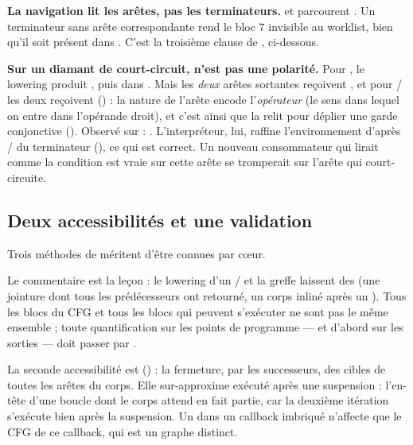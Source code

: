 \begin{piege}
\textbf{La navigation lit les arêtes, pas les terminateurs.}  et  parcourent . Un terminateur  sans arête  correspondante rend le bloc 7 invisible au worklist, bien qu'il soit présent dans . C'est la troisième clause de , ci-dessous.
\end{piege}

\begin{piege}
\textbf{Sur un diamant de court-circuit,  n'est pas une polarité.} Pour , le lowering produit , puis  dans . Mais les \emph{deux} arêtes sortantes reçoivent , et pour \code{||}/ les deux reçoivent  () : la nature de l'arête encode l'\emph{opérateur} (le sens dans lequel on entre dans l'opérande droit), et c'est ainsi que  la relit pour déplier une garde conjonctive (). Observé sur  : . L'interpréteur, lui, raffine l'environnement d'après / du terminateur (), ce qui est correct. Un nouveau consommateur qui lirait  comme \og la condition est vraie sur cette arête\fg{} se tromperait sur l'arête qui court-circuite.
\end{piege}

\subsection{Deux accessibilités et une validation}

Trois méthodes de  méritent d'être connues par cœur.


Le commentaire est la leçon : le lowering d'un / et la greffe laissent des  (une jointure dont tous les prédécesseurs ont retourné, un corps inliné après un ). \og Tous les blocs du CFG\fg{} et \og tous les blocs qui peuvent s'exécuter\fg{} ne sont pas le même ensemble ; toute quantification sur les points de programme --- et d'abord sur les sorties --- doit passer par .

La seconde accessibilité est  () : la fermeture, par les successeurs, des cibles de toutes les arêtes  du corps. Elle sur-approxime \og exécuté après une suspension\fg{} : l'en-tête d'une boucle dont le corps attend en fait partie, car la deuxième itération s'exécute bien après la suspension. Un  dans un callback imbriqué n'affecte que le CFG de ce callback, qui est un graphe distinct.

